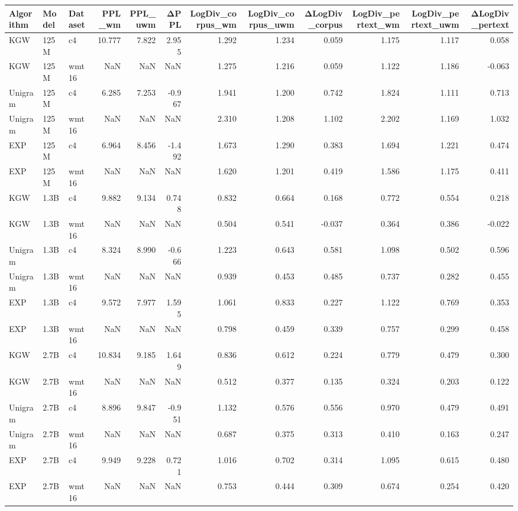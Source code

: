\begin{tabular}{lllrrrrrrrrr}
\toprule
Algorithm & Model & Dataset & PPL_wm & PPL_uwm & ΔPPL & LogDiv_corpus_wm & LogDiv_corpus_uwm & ΔLogDiv_corpus & LogDiv_pertext_wm & LogDiv_pertext_uwm & ΔLogDiv_pertext \\
\midrule
KGW & 125M & c4 & 10.777 & 7.822 & 2.955 & 1.292 & 1.234 & 0.059 & 1.175 & 1.117 & 0.058 \\
KGW & 125M & wmt16 & NaN & NaN & NaN & 1.275 & 1.216 & 0.059 & 1.122 & 1.186 & -0.063 \\
Unigram & 125M & c4 & 6.285 & 7.253 & -0.967 & 1.941 & 1.200 & 0.742 & 1.824 & 1.111 & 0.713 \\
Unigram & 125M & wmt16 & NaN & NaN & NaN & 2.310 & 1.208 & 1.102 & 2.202 & 1.169 & 1.032 \\
EXP & 125M & c4 & 6.964 & 8.456 & -1.492 & 1.673 & 1.290 & 0.383 & 1.694 & 1.221 & 0.474 \\
EXP & 125M & wmt16 & NaN & NaN & NaN & 1.620 & 1.201 & 0.419 & 1.586 & 1.175 & 0.411 \\
KGW & 1.3B & c4 & 9.882 & 9.134 & 0.748 & 0.832 & 0.664 & 0.168 & 0.772 & 0.554 & 0.218 \\
KGW & 1.3B & wmt16 & NaN & NaN & NaN & 0.504 & 0.541 & -0.037 & 0.364 & 0.386 & -0.022 \\
Unigram & 1.3B & c4 & 8.324 & 8.990 & -0.666 & 1.223 & 0.643 & 0.581 & 1.098 & 0.502 & 0.596 \\
Unigram & 1.3B & wmt16 & NaN & NaN & NaN & 0.939 & 0.453 & 0.485 & 0.737 & 0.282 & 0.455 \\
EXP & 1.3B & c4 & 9.572 & 7.977 & 1.595 & 1.061 & 0.833 & 0.227 & 1.122 & 0.769 & 0.353 \\
EXP & 1.3B & wmt16 & NaN & NaN & NaN & 0.798 & 0.459 & 0.339 & 0.757 & 0.299 & 0.458 \\
KGW & 2.7B & c4 & 10.834 & 9.185 & 1.649 & 0.836 & 0.612 & 0.224 & 0.779 & 0.479 & 0.300 \\
KGW & 2.7B & wmt16 & NaN & NaN & NaN & 0.512 & 0.377 & 0.135 & 0.324 & 0.203 & 0.122 \\
Unigram & 2.7B & c4 & 8.896 & 9.847 & -0.951 & 1.132 & 0.576 & 0.556 & 0.970 & 0.479 & 0.491 \\
Unigram & 2.7B & wmt16 & NaN & NaN & NaN & 0.687 & 0.375 & 0.313 & 0.410 & 0.163 & 0.247 \\
EXP & 2.7B & c4 & 9.949 & 9.228 & 0.721 & 1.016 & 0.702 & 0.314 & 1.095 & 0.615 & 0.480 \\
EXP & 2.7B & wmt16 & NaN & NaN & NaN & 0.753 & 0.444 & 0.309 & 0.674 & 0.254 & 0.420 \\
\bottomrule
\end{tabular}
